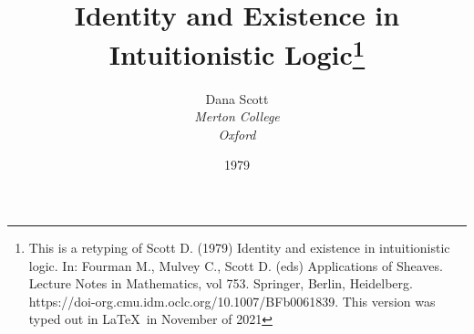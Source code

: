 %
%
%

\usepackage[papersize={6.7in, 10.0in}, left=.5in, right=.5in, top=1in, bottom=.9in]{geometry}
\linespread{1.1}
\raggedbottom
\pagestyle{plain}
\usepackage{mathpartir}
\usepackage{stmaryrd}
\usepackage{mathtools}
\usepackage{tikz-cd}
\usepackage{microtype}
\usepackage{amssymb}




\usepackage[small]{titlesec}
\usepackage{cite}

\setcounter{tocdepth}{3}

\def\to{\rightarrow}
\def\imp{\shortrightarrow}
\def\iff{\leftrightarrow}
\def\union{\cup}
\def\inc{\subseteq}
\def\dom{\mathop{\rm dom}}
\def\cod{\mathop{\rm cod}}
\def\id{{\mathrm 1}}
\def\res{\!\upharpoonleft\!}
\def\ffam{\varphi}
\def\comp{\circ}
\def\bbone{\mathbb 1}
\def\zeromap{0}
\def\bbzero{{\mathbb O}}
\def\ccc{{c.c.c.}}
\def\ev{\varepsilon}
\def\ebc{\varepsilon_{BC}}
\def\L{\Lambda}
\def\l{\lambda}
\def\lm#1.#2{\lambda#1.\, #2}
\def\br#1{[\, #1 \, ]}
\def\V{V}
\def\U{U}
\def\D{D}
\def\C{\mathcal C}
\def\S{\mathcal S}
\def\lxy{\l x\, \l y . \,}
\def\lmm#1#2.#3{\l #1\, \l #2 . \, #3}
\def\sss{(*\!*\!*)}
\def\ss{(**)}
\def\ssn{(**_n)}
\def\scop{\S^{\C^{op}}}
\def\PU{\mathcal P U}
\def\P{\mathcal P}
\def\UU{(U\to U)}
\def\BA{B \to A}
\def\AB{A \to B}

\makeatletter
\newcommand*\dotop{\mathpalette\bigcdot@{.6}}
\newcommand*\bigcdot@[2]{\mathbin{\vcenter{\hbox{\scalebox{#2}{$\m@th#1\bullet$}}}}}
\makeatother

\title{\large Identity and Existence in Intuitionistic Logic\footnote{This is a retyping of Scott D. (1979) Identity and existence in intuitionistic logic. In: Fourman M., Mulvey C., Scott D. (eds) Applications of Sheaves. Lecture Notes in Mathematics, vol 753. Springer, Berlin, Heidelberg. https://doi-org.cmu.idm.oclc.org/10.1007/BFb0061839. This version was typed out in \LaTeX\ in November of 2021}
}
\author{\normalsize Dana Scott \\
{\small\it Merton College}\\
{\small\it Oxford}}
\date{\small 1979}



